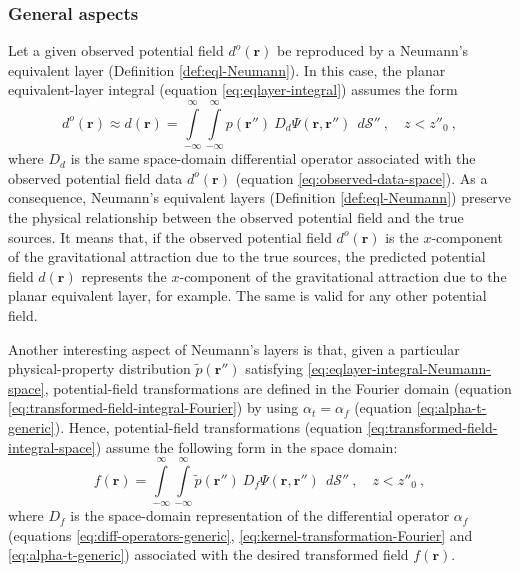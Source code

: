 \subsubsection{General aspects}

Let a given observed potential field $d^{o}(\mathbf{r})$ be reproduced by a 
Neumann's equivalent layer (Definition \ref{def:eql-Neumann}). 
In this case, the planar equivalent-layer integral (equation \ref{eq:eqlayer-integral}) assumes the form
\begin{equation}
	d^{o}(\mathbf{r}) \approx
	d(\mathbf{r})
	= \int\limits_{-\infty}^{\infty}\int\limits_{-\infty}^{\infty}
	p(\mathbf{r}'') \: D_{d} \Psi(\mathbf{r}, \mathbf{r}'') \:\: d\mathcal{S}''
	\: , \quad z < z''_{0} \: ,
	\label{eq:eqlayer-integral-Neumann-space}
\end{equation}
where $D_{d}$ is the same space-domain differential operator associated with
the observed potential field data $d^{o}(\mathbf{r})$ (equation \ref{eq:observed-data-space}).
As a consequence, Neumann's equivalent layers (Definition \ref{def:eql-Neumann}) preserve the physical
relationship between the observed potential field and the true sources.
It means that, if the observed potential field $d^{o}(\mathbf{r})$ is the $x$-component of the 
gravitational attraction due to the true sources, the predicted potential field $d(\mathbf{r})$
represents the $x$-component of the gravitational attraction due to the planar equivalent layer, for example.
The same is valid for any other potential field.

Another interesting aspect of Neumann's layers is that, given a particular physical-property distribution 
$\tilde{p}(\mathbf{r}'')$ satisfying \ref{eq:eqlayer-integral-Neumann-space}, potential-field transformations 
are defined in the Fourier domain (equation \ref{eq:transformed-field-integral-Fourier}) by using 
$\alpha_{t} = \alpha_{f}$ (equation \ref{eq:alpha-t-generic}). Hence, potential-field transformations
(equation \ref{eq:transformed-field-integral-space}) assume the following form in the space domain:
\begin{equation}
	f(\mathbf{r})
	= \int\limits_{-\infty}^{\infty}\int\limits_{-\infty}^{\infty}
	\tilde{p}(\mathbf{r}'') \: D_{f} \Psi(\mathbf{r}, \mathbf{r}'') \:\: d\mathcal{S}''
	\: , \quad z < z''_{0} \: ,
	\label{eq:transformed-field-integral-Neumann-space}
\end{equation}
where $D_{f}$ is the space-domain representation of the differential operator $\alpha_{f}$ 
(equations \ref{eq:diff-operators-generic}, \ref{eq:kernel-transformation-Fourier} 
and \ref{eq:alpha-t-generic}) associated with the desired transformed field $f(\mathbf{r})$.

